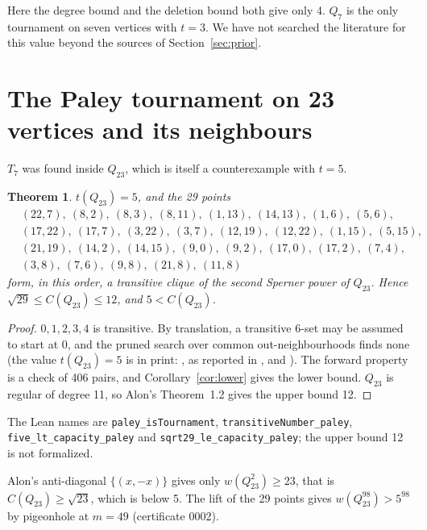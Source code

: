 \documentclass[11pt]{article}
\newtheorem{theorem}{Theorem}
\theoremstyle{definition}
\theoremstyle{remark}
\begin{document}
Here the degree bound and the deletion bound both give only 4. $Q_7$ is the only tournament on seven
vertices with $t = 3$. We have not searched the literature for this value beyond the sources of
Section~\ref{sec:prior}.

\section{The Paley tournament on 23 vertices and its neighbours}\label{sec:q23}

$T_7$ was found inside $Q_{23}$, which is itself a counterexample with $t = 5$.

\begin{theorem}\label{thm:q23}
$t(Q_{23}) = 5$, and the 29 points
\[
\begin{aligned}
&(22,7),\ (8,2),\ (8,3),\ (8,11),\ (1,13),\ (14,13),\ (1,6),\ (5,6),\\
&(17,22),\ (17,7),\ (3,22),\ (3,7),\ (12,19),\ (12,22),\ (1,15),\ (5,15),\\
&(21,19),\ (14,2),\ (14,15),\ (9,0),\ (9,2),\ (17,0),\ (17,2),\ (7,4),\\
&(3,8),\ (7,6),\ (9,8),\ (21,8),\ (11,8)
\end{aligned}
\]
form, in this order, a transitive clique of the second Sperner power of $Q_{23}$. Hence
$\sqrt{29} \le C(Q_{23}) \le 12$, and $5 < C(Q_{23})$.
\end{theorem}

\begin{proof}
$0, 1, 2, 3, 4$ is transitive. By translation, a transitive 6-set may be assumed to start at $0$, and
the pruned search over common out-neighbourhoods finds none (the value $t(Q_{23}) = 5$ is in print:
\cite{sanchez}, as reported in \cite{nmh}, and \cite[Table~2]{ms}). The forward property is a check of 406
pairs, and Corollary~\ref{cor:lower} gives the lower bound. $Q_{23}$ is regular of degree 11, so
Alon's Theorem~1.2 gives the upper bound 12.
\end{proof}

The Lean names are \texttt{paley\_isTournament}, \texttt{transitiveNumber\_paley},
\texttt{five\_lt\_capacity\_paley} and \texttt{sqrt29\_le\_capacity\_paley}; the upper bound 12 is
not formalized.

Alon's anti-diagonal $\{(x, -x)\}$ gives only $w(Q_{23}^2) \ge 23$, that is $C(Q_{23}) \ge \sqrt{23}$,
which is below 5. The lift of the 29 points gives $w(Q_{23}^{98}) > 5^{98}$ by pigeonhole at $m = 49$
(certificate 0002).
\end{document}
